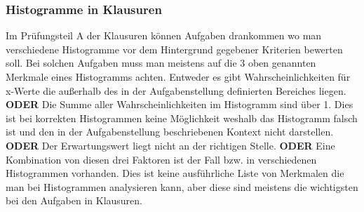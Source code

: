 	\subsubsection{Histogramme in Klausuren}
	Im Prüfungsteil A der Klausuren können Aufgaben drankommen wo man verschiedene Histogramme vor dem Hintergrund gegebener Kriterien bewerten soll. Bei solchen Aufgaben muss man meistens auf die 3 oben genannten Merkmale eines Histogramms achten. Entweder es gibt Wahrscheinlichkeiten für x-Werte die außerhalb des in der Aufgabenstellung definierten Bereiches liegen. \textbf{ODER} Die Summe aller Wahrscheinlichkeiten im Histogramm sind über 1. Dies ist bei korrekten Histogrammen keine Möglichkeit weshalb das Histogramm falsch ist und den in der Aufgabenstellung beschriebenen Kontext nicht darstellen. \textbf{ODER} Der Erwartungswert liegt nicht an der richtigen Stelle. \textbf{ODER} Eine Kombination von diesen drei Faktoren ist der Fall bzw. in verschiedenen Histogrammen vorhanden. Dies ist keine ausführliche Liste von Merkmalen die man bei Histogrammen analysieren kann, aber diese sind meistens die wichtigsten bei den Aufgaben in Klausuren.